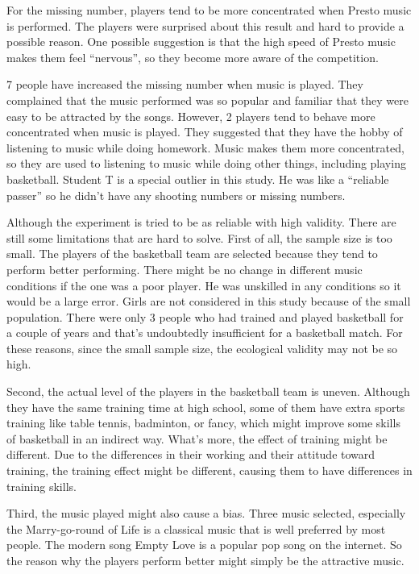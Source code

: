 \documentclass[man,floatsintext]{apa7}
\begin{document}
For the missing number, players tend to be more concentrated when Presto music is performed. The players were surprised about this result and hard to provide a possible reason. One possible suggestion is that the high speed of Presto music makes them feel ``nervous'', so they become more aware of the competition. 

7 people have increased the missing number when music is played. They complained that the music performed was so popular and familiar that they were easy to be attracted by the songs. However, 2 players tend to behave more concentrated when music is played. They suggested that they have the hobby of listening to music while doing homework. Music makes them more concentrated, so they are used to listening to music while doing other things, including playing basketball. Student T is a special outlier in this study. He was like a ``reliable passer'' so he didn't have any shooting numbers or missing numbers.

Although the experiment is tried to be as reliable with high validity. There are still some limitations that are hard to solve. First of all, the sample size is too small. The players of the basketball team are selected because they tend to perform better performing. There might be no change in different music conditions if the one was a poor player. He was unskilled in any conditions so it would be a large error. Girls are not considered in this study because of the small population. There were only 3 people who had trained and played basketball for a couple of years and that's undoubtedly insufficient for a basketball match. For these reasons, since the small sample size, the ecological validity may not be so high.

Second, the actual level of the players in the basketball team is uneven. Although they have the same training time at high school, some of them have extra sports training like table tennis, badminton, or fancy, which might improve some skills of basketball in an indirect way. What's more, the effect of training might be different. Due to the differences in their working and their attitude toward training, the training effect might be different, causing them to have differences in training skills. 

Third, the music played might also cause a bias. Three music selected, especially the Marry-go-round of Life is a classical music that is well preferred by most people. The modern song Empty Love is a popular pop song on the internet. So the reason why the players perform better might simply be the attractive music. 
\end{document}
